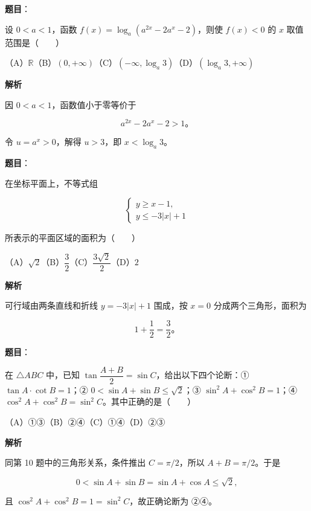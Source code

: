 \begin{answer}

\textbf{题目}：

设 $0<a<1$，函数 $f(x)=\log_a(a^{2x}-2a^x-2)$，则使 $f(x)<0$ 的 $x$ 取值范围是\mbox{（　　）}

（A）$\mathbb R$\quad（B）$(0,+\infty)$\quad（C）$(-\infty,\log_a3)$\quad（D）$(\log_a3,+\infty)$

\textbf{解析}

因 $0<a<1$，函数值小于零等价于

\nopagebreak[4]
\[
a^{2x}-2a^x-2>1\text{。}
\]

令 $u=a^x>0$，解得 $u>3$，即 $x<\log_a3$。


\end{answer}
\begin{answer}

\textbf{题目}：

在坐标平面上，不等式组

\nopagebreak[4]
\[
\begin{cases}
y\geqslant x-1,\\
y\leqslant-3|x|+1
\end{cases}
\]

所表示的平面区域的面积为\mbox{（　　）}

（A）$\sqrt2$\quad（B）$\dfrac32$\quad（C）$\dfrac{3\sqrt2}{2}$\quad（D）$2$

\textbf{解析}

可行域由两条直线和折线 $y=-3|x|+1$ 围成，按 $x=0$ 分成两个三角形，面积为

\nopagebreak[4]
\[
1+\frac12=\frac32\text{。}
\]


\end{answer}
\begin{answer}

\textbf{题目}：

在 $\triangle ABC$ 中，已知 $\tan\dfrac{A+B}{2}=\sin C$，给出以下四个论断：① $\tan A\cdot\cot B=1$；② $0<\sin A+\sin B\leqslant\sqrt2$；③ $\sin^2A+\cos^2B=1$；④ $\cos^2A+\cos^2B=\sin^2C$。其中正确的是\mbox{（　　）}

（A）①③\quad（B）②④\quad（C）①④\quad（D）②③

\textbf{解析}

同第 10 题中的三角形关系，条件推出 $C=\pi/2$，所以 $A+B=\pi/2$。于是

\nopagebreak[4]
\[
0<\sin A+\sin B=\sin A+\cos A\leqslant\sqrt2,
\]

且 $\cos^2A+\cos^2B=1=\sin^2C$，故正确论断为 ②④。


\end{answer}
